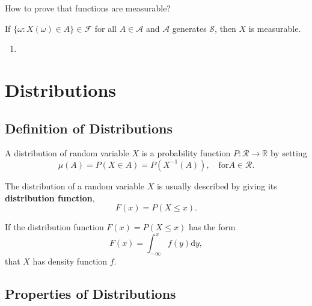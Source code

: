 How to prove that functions are measurable?

\begin{theorem}
    If $\{\omega:X(\omega)\in A\}\in\mathcal{F}$ for all $A\in\mathcal{A}$ and $\mathcal{A}$ generates $\mathcal{S}$, then $X$ is measurable.
\end{theorem}

\begin{enumerate}
    \item
\end{enumerate}

\section{Distributions}

\subsection{Definition of Distributions}

\begin{definition}[Distribution]
    A distribution of random variable $X$ is a probability function $P:\mathcal{R}\rightarrow\mathbb{R}$ by setting
    \begin{equation}
        \mu(A)=P(X\in A)=P\left(X^{-1}(A)\right),\quad\text{for}A\in\mathcal{R}.
    \end{equation}
\end{definition}

\begin{definition}
    The distribution of a random variable $X$ is usually described by giving its \textbf{distribution function},
    \begin{equation}
        F(x)=P(X\leq x).
    \end{equation}
\end{definition}

\begin{definition}
    If the distribution function $F(x)=P(X\leq x)$ has the form
    \begin{equation*}
        F(x)=\int_{-\infty}^{x}f(y)\mathrm{d}y,
    \end{equation*}
    that $X$ has density function $f$.
\end{definition}

\subsection{Properties of Distributions}


